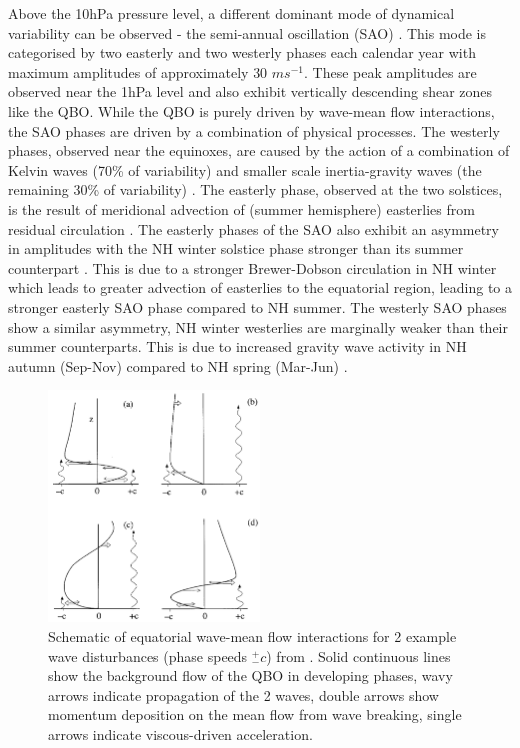 {Above the 10hPa pressure level, a different dominant mode of dynamical variability can be observed - the semi-annual oscillation (SAO) \citep{Baldwin2001}. This mode is categorised by two easterly and two westerly phases each calendar year with maximum amplitudes of approximately 30 $ms^{-1}$. These peak amplitudes are observed near the 1hPa level and also exhibit vertically descending shear zones like the QBO. While the QBO is purely driven by wave-mean flow interactions, the SAO phases are driven by a combination of physical processes. The westerly phases, observed near the equinoxes, are caused by the action of a combination of Kelvin waves (70\% of variability) and smaller scale inertia-gravity waves (the remaining 30\% of variability) \citep{Dunkerton1982,Hitchman1988}. The easterly phase, observed at the two solstices, is the result of meridional advection of (summer hemisphere) easterlies from residual circulation \citep{HoltonWerb1980,MahlmanJ.D.1980}. The easterly phases of the SAO also exhibit an asymmetry in amplitudes with the NH winter solstice phase stronger than its summer counterpart \citep{Dunkerton1982}. This is due to a stronger Brewer-Dobson circulation in NH winter which leads to greater advection of easterlies to the equatorial region, leading to a stronger easterly SAO phase compared to NH summer. The westerly SAO phases show a similar asymmetry, NH winter westerlies are marginally weaker than their summer counterparts. This is due to increased gravity wave activity in NH autumn (Sep-Nov) compared to NH spring (Mar-Jun) \citep{Ray98}. 

\begin{figure}[h!]
\centering
    \includegraphics[width=0.5\textwidth]{Figures/Figures-background/Schematic_of_QBO_waves.png}
    \caption[Schematic of equatorial wave-mean flow interactions.]{Schematic of equatorial wave-mean flow interactions for 2 example wave disturbances (phase speeds $^+_- c$) from \cite{Plumb1984}. Solid continuous lines show the background flow of the QBO in developing phases, wavy arrows indicate propagation of the 2 waves, double arrows show momentum deposition on the mean flow from wave breaking, single arrows indicate viscous-driven acceleration.}
    \label{fig:QBO_wave_schematic}
\centering
\end{figure}

}
